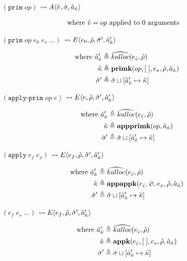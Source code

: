 \documentclass[12pt,draft]{article}
\newcommand{\primsyn}[2]{(\texttt{prim}\;#1\;#2\;...)}
\newcommand{\singleprimsyn}[1]{(\texttt{prim}\;#1)}
\newcommand{\applyprimsyn}[2]{(\texttt{apply-prim}\;#1\;#2)}
\newcommand{\applysyn}[2]{(\texttt{apply}\;#1\;#2)}
\newcommand{\E}[4]{E\langle #1 , #2 , #3 , #4 \rangle}
\newcommand{\A}[3]{A\langle #1 , #2 , #3 \rangle}
\begin{document}
{\begin{multicols*}{2}
\begin{center}
  $\singleprimsyn{op}$
  $\leadsto \A{\aval}{\astore}{\akaddr}$
\end{center}
\vspace{-7mm}
\begin{align*}
\text{where } \hat{v} &= op \text{ applied to } 0 \text{ arguments}
\end{align*}
\begin{center}
  $\primsyn{op}{e_0\;e_s}$
  $\leadsto \E{e_0}{\aenv}{\astore'}{\akaddr'}$
\end{center}
\vspace{-7mm}
\begin{align*}
  \text{where }
  \hat{a}_{\hat{\kappa}}' &\triangleq \widehat{kalloc}(e_{\hat{\varsigma}} , \hat{\rho}) \\
  \hat{\kappa} &\triangleq \textbf{primk}(op , [\;] , e_s , \hat{\rho} , \hat{a}_{\hat{\kappa}}) \\
  \hat{\sigma}' &\triangleq \hat{\sigma} \sqcup [\hat{a}_{\hat{\kappa}}' \mapsto \hat{\kappa}]
\end{align*}
\begin{center}
  $\applyprimsyn{op}{e}$
  $\leadsto \E{e}{\aenv}{\astore'}{\akaddr'}$
\end{center}
\vspace{-7mm}
\begin{align*}
  \text{where }
  \hat{a}_{\hat{\kappa}}' &\triangleq \widehat{kalloc}(e_{\hat{\varsigma}} , \hat{\rho}) \\
  \hat{\kappa} &\triangleq \textbf{appprimk}(op, \hat{a}_{\hat{\kappa}}) \\
  \hat{\sigma}' &\triangleq \hat{\sigma} \sqcup [\hat{a}_{\hat{\kappa}}' \mapsto \hat{\kappa}]
\end{align*}
\begin{center}
  $\applysyn{e_f}{e_x}$
  $\leadsto \E{e_f}{\aenv}{\astore'}{\akaddr'}$
\end{center}
\vspace{-7mm}
\begin{align*}
  \text{where }
  \hat{a}_{\hat{\kappa}}' &\triangleq \widehat{kalloc}(e_{\hat{\varsigma}} , \hat{\rho}) \\
  \hat{\kappa} &\triangleq \textbf{appappk}(e_{\hat{\varsigma}},\varnothing , e_x , \hat{\rho} , \hat{a}_{\hat{\kappa}}) \\
  \hat{\sigma}' &\triangleq \hat{\sigma} \sqcup [\hat{a}_{\hat{\kappa}}' \mapsto \hat{\kappa}]
\end{align*}
\begin{center}
  $(e_f\;e_s\;...)$
  $\leadsto \E{e_f}{\aenv}{\astore'}{\akaddr'}$
\end{center}
\vspace{-7mm}
\begin{align*}
  \text{where }
  \hat{a}_{\hat{\kappa}}' &\triangleq \widehat{kalloc}(e_{\hat{\varsigma}} , \hat{\rho}) \\
  \hat{\kappa} &\triangleq \textbf{appk}(e_{\hat{\varsigma}} , [\;] , e_s , \hat{\rho} , \hat{a}_{\hat{\kappa}}) \\
  \hat{\sigma}' &\triangleq \hat{\sigma} \sqcup [\hat{a}_{\hat{\kappa}}' \mapsto \hat{\kappa}]
\end{align*}
\end{multicols*}
}
\end{document}
